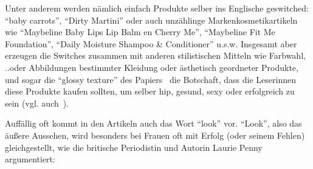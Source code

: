 Unter anderem werden nämlich einfach Produkte selber ins Englische geswitched: ``baby carrots'', ``Dirty Martini'' oder auch unzählinge Markenkosmetikartikeln wie ``Maybeline Baby Lips Lip Balm en Cherry Me'', ``Maybeline Fit Me Foundation'', ``Daily Moisture Shampoo \& Conditioner'' u.s.w.
Insgesamt aber erzeugen die Switches zusammen mit anderen stilistischen Mitteln wie Farbwahl, ..oder Abbildungen bestimmter Kleidung oder ästhetisch geordneter Produkte, und sogar die ``glossy texture'' des Papiers~\cite[S.6]{McCracken93} die Botschaft, dass die Leserinnen diese Produkte kaufen sollten, um selber hip, gesund, sexy oder erfolgreich zu sein (vgl. auch~\cite{Eckert08}).

\begin{comment}
Es wurden zum Beispiel bei Vokabeln, die mit Fitness und Gesundheit zu tun haben (``fitness'', ``light'', ``baby carrots'', ``workout'', ``bicycle crunches''), einige Switches ins Englische vorgefunden.
Damit lenken die Herausgeberinnen die Aufmerksamkeit auf die Produkte? selber aber auch auf den generellen Sachverhalt, der in den einzelnen Fällen beschrieben wird.

Außerdem scheint Englisch auch mit einem modernen, hippen und erfolgreichen Lebensstil gleichgesetzt zu werden und oft mit einzelnen Gegenständen oder Dienstleistungen, die dafür erworben werden können.
Hier können Begriffe wie ``coffeehouse'', ``Dirty Martini'', ``trendy'', ``vintage'' oder ``glamour'' verortet werden.
\end{comment}

Auffällig oft kommt in den Artikeln auch das Wort ``look'' vor.
``Look'', also das äußere Aussehen, wird besonders bei Frauen oft mit Erfolg (oder seinem Fehlen) gleichgestellt, wie die britische Periodistin und Autorin Laurie Penny argumentiert:


